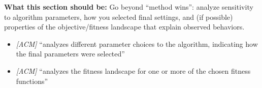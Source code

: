 \noindent\textbf{What this section should be:}
Go beyond ``method wins'': analyze sensitivity to algorithm parameters, how you selected final settings, and (if possible) properties of the objective/fitness landscape that explain observed behaviors.
\begin{itemize}
  \item \textit{[ACM]} ``analyzes different parameter choices to the algorithm, indicating how the final parameters were selected''
  \item \textit{[ACM]} ``analyzes the fitness landscape for one or more of the chosen fitness functions''
\end{itemize}